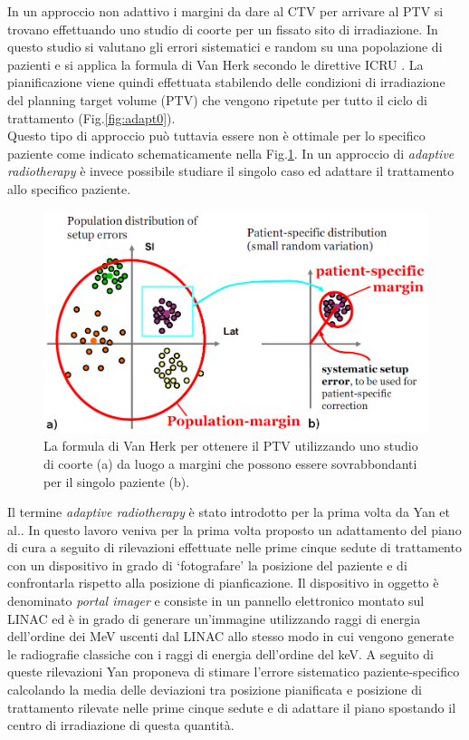 In un approccio non adattivo i margini da dare al CTV per arrivare al PTV si trovano effettuando uno studio di coorte per un fissato sito di irradiazione. In questo studio si valutano gli errori sistematici e random su una popolazione di pazienti e si applica la formula di Van Herk secondo le direttive ICRU \cite{ICRU62}. La pianificazione viene quindi effettuata stabilendo delle condizioni di irradiazione del planning target volume (PTV)  che vengono ripetute per tutto il ciclo di trattamento (Fig.\ref{fig:adapt0}).\\
Questo tipo di approccio può tuttavia essere non è ottimale per lo specifico paziente come indicato schematicamente nella Fig.\ref{fig:margins}. In un approccio di \textit{adaptive radiotherapy} è invece possibile studiare il singolo caso ed adattare il trattamento allo specifico paziente.
\begin{figure}
\centering
\includegraphics[width=.8\textwidth]{./cap3/margins.png}
\caption{La formula di Van Herk per ottenere il PTV utilizzando uno studio di coorte (a) da luogo a margini che possono essere sovrabbondanti per il singolo paziente (b).}
\label{fig:margins}
\end{figure}

Il termine \textit{adaptive radiotherapy} è stato introdotto per la prima volta  da Yan et al.\cite{Yan1996}. In questo lavoro veniva per la prima volta proposto un adattamento del piano di cura a seguito di rilevazioni effettuate nelle prime cinque sedute di trattamento con un dispositivo in grado di `fotografare' la posizione del paziente e di confrontarla rispetto alla posizione di pianficazione. Il dispositivo in oggetto è denominato \textit{portal imager} e consiste in un pannello elettronico montato sul LINAC ed è in grado di generare un'immagine utilizzando raggi di energia dell'ordine dei MeV uscenti dal LINAC allo stesso modo in cui vengono generate le radiografie classiche con i raggi di energia dell'ordine del keV. A seguito di queste rilevazioni Yan proponeva di stimare l'errore sistematico paziente-specifico calcolando la media delle deviazioni tra posizione pianificata e posizione di trattamento rilevate nelle prime cinque sedute e di adattare il piano spostando il centro di irradiazione di questa quantità.

